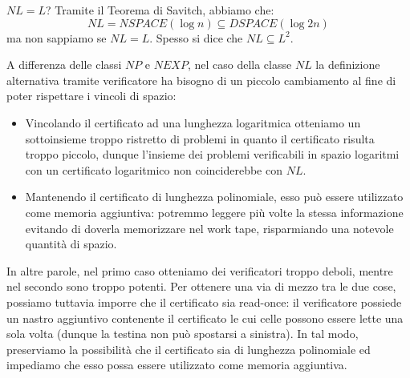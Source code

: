 \begin{Osservation}{$NL = L$?}{}
Tramite il Teorema di Savitch, abbiamo che:
\begin{equation*}
    NL = NSPACE(\log n)\subseteq DSPACE(\log2 n)
\end{equation*}
ma non sappiamo se $NL = L$. Spesso si dice che $NL\subseteq L^2$.

A differenza delle classi $NP$ e $NEXP$, nel caso della classe $NL$ la definizione alternativa tramite verificatore ha bisogno di un piccolo cambiamento al fine di poter rispettare i vincoli di spazio:
\begin{itemize}
    \item Vincolando il certificato ad una lunghezza logaritmica otteniamo un sottoinsieme troppo ristretto di problemi in quanto il certificato risulta troppo piccolo, dunque l’insieme dei problemi verificabili in spazio logaritmi con un certificato logaritmico non coinciderebbe con $NL$.
    \item Mantenendo il certificato di lunghezza polinomiale, esso può essere utilizzato come memoria aggiuntiva: potremmo leggere più volte la stessa informazione evitando di doverla memorizzare nel work tape, risparmiando una notevole quantità di spazio.
\end{itemize}
In altre parole, nel primo caso otteniamo dei verificatori troppo deboli, mentre nel secondo sono troppo potenti. Per ottenere una via di mezzo tra le due cose, possiamo tuttavia imporre che il certificato sia read-once: il verificatore possiede un nastro aggiuntivo contenente il certificato le cui celle possono essere lette una sola volta (dunque la testina non può spostarsi a sinistra). In tal modo, preserviamo la possibilità che il certificato sia di lunghezza polinomiale ed impediamo che esso possa essere utilizzato come memoria aggiuntiva.
\end{Osservation}

